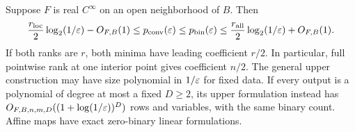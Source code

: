 \begin{theorem}\label{thm:smooth-ranks}
Suppose $F$ is real $C^\infty$ on an open neighborhood of $B$. Then
\begin{equation}\label{eq:smooth-sandwich}
 \frac{r_{\mathrm{loc}}}{2}\log_2(1/\varepsilon)-O_{F,B}(1)
 \le p_{\mathrm{conv}}(\varepsilon)\le p_{\mathrm{bin}}(\varepsilon)
 \le\frac{r_{\mathrm{all}}}{2}\log_2(1/\varepsilon)+O_{F,B}(1).
\end{equation}
If both ranks are $r$, both minima have leading coefficient $r/2$.
In particular, full pointwise rank at one interior point gives
coefficient $n/2$. The general upper construction may have size
polynomial in $1/\varepsilon$ for fixed data. If every output is a polynomial
of degree at most a fixed $D\ge2$, its upper formulation instead has
$O_{F,B,n,m,D}((1+\log(1/\varepsilon))^D)$ rows and variables, with the same
binary count. Affine maps have exact zero-binary linear formulations.
\end{theorem}
